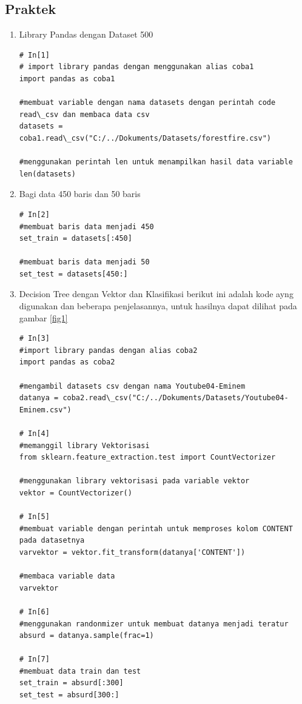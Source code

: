 \subsection{Praktek}
\begin{enumerate}
\item Library Pandas dengan Dataset 500
\begin{verbatim}
# In[1] 
# import library pandas dengan menggunakan alias coba1
import pandas as coba1 

#membuat variable dengan nama datasets dengan perintah code read\_csv dan membaca data csv
datasets = coba1.read\_csv("C:/../Dokuments/Datasets/forestfire.csv")

#menggunakan perintah len untuk menampilkan hasil data variable
len(datasets)
\end{verbatim}

\item Bagi data 450 baris dan 50 baris
\begin{verbatim}
# In[2]
#membuat baris data menjadi 450
set_train = datasets[:450]

#membuat baris data menjadi 50
set_test = datasets[450:]
\end{verbatim}

\item Decision Tree dengan Vektor dan Klasifikasi
\subitem berikut ini adalah kode ayng digunakan dan beberapa penjelasannya, untuk hasilnya dapat dilihat pada gambar \ref{fig1}
\begin{verbatim}
# In[3]
#import library pandas dengan alias coba2
import pandas as coba2

#mengambil datasets csv dengan nama Youtube04-Eminem
datanya = coba2.read\_csv("C:/../Dokuments/Datasets/Youtube04-Eminem.csv")

# In[4]
#memanggil library Vektorisasi
from sklearn.feature_extraction.test import CountVectorizer

#menggunakan library vektorisasi pada variable vektor
vektor = CountVectorizer()

# In[5]
#membuat variable dengan perintah untuk memproses kolom CONTENT pada datasetnya
varvektor = vektor.fit_transform(datanya['CONTENT'])

#membaca variable data
varvektor

# In[6]
#menggunakan randonmizer untuk membuat datanya menjadi teratur
absurd = datanya.sample(frac=1)

# In[7]
#membuat data train dan test
set_train = absurd[:300]
set_test = absurd[300:]


\end{verbatim}
\end{enumerate}
